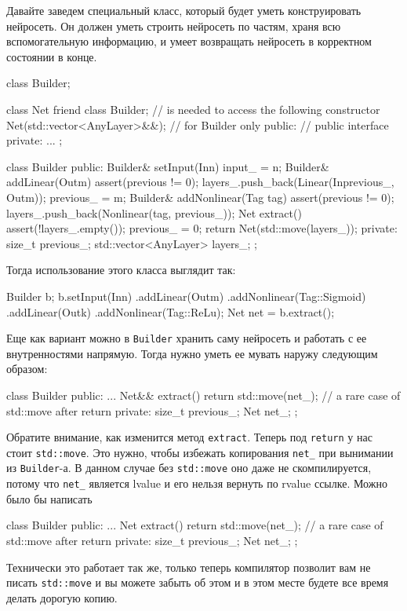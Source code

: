 Давайте заведем специальный класс, который будет уметь конструировать нейросеть.
Он должен уметь строить нейросеть по частям, храня всю вспомогательную информацию, и умеет возвращать нейросеть в корректном состоянии в конце.
\begin{cppcode}
class Builder;

class Net {
  friend class Builder; // is needed to access the following constructor
  Net(std::vector<AnyLayer>&&); // for Builder only
public:
  // public interface
private:
  ...
};

class Builder {
public:
  Builder& setInput(In{n}) {
    input_ = n;
  }
  Builder& addLinear(Out{m}) {
    assert(previous != 0);
    layers_.push_back(Linear(In{previous_}, Out{m}));
    previous_ = m;
  }
  Builder& addNonlinear(Tag tag) {
    assert(previous != 0);
    layers_.push_back(Nonlinear(tag, previous_));
  }
  Net extract() {
    assert(!layers_.empty());
    previous_ = 0;
    return Net(std::move(layers_));
  }
private:
  size_t previous_;
  std::vector<AnyLayer> layers_;
};
\end{cppcode}
Тогда использование этого класса выглядит так:
\begin{cppcode}
Builder b;
b.setInput(In{n})
 .addLinear(Out{m})
 .addNonlinear(Tag::Sigmoid)
 .addLinear(Out{k})
 .addNonlinear(Tag::ReLu);
Net net = b.extract();
\end{cppcode}
Еще как вариант можно в \verb"Builder" хранить саму нейросеть и работать с ее внутренностями напрямую.
Тогда нужно уметь ее мувать наружу следующим образом:
\begin{cppcode}
class Builder {
public:
  ...
  Net&& extract() {
    return std::move(net_); // a rare case of std::move after return
  }
private:
  size_t previous_;
  Net net_;
};
\end{cppcode}
Обратите внимание, как изменится метод \verb"extract".
Теперь под \verb"return" у нас стоит \verb"std::move".
Это нужно, чтобы избежать копирования \verb"net_" при вынимании из \verb"Builder"-а.
В данном случае без \verb"std::move" оно даже не скомпилируется, потому что \verb"net_" является lvalue и его нельзя вернуть по rvalue ссылке.
Можно было бы написать
\begin{cppcode}
class Builder {
public:
  ...
  Net extract() {
    return std::move(net_); // a rare case of std::move after return
  }
private:
  size_t previous_;
  Net net_;
};
\end{cppcode}
Технически это работает так же, только теперь компилятор позволит вам не писать \verb"std::move" и вы можете забыть об этом и в этом месте будете все время делать дорогую копию.

